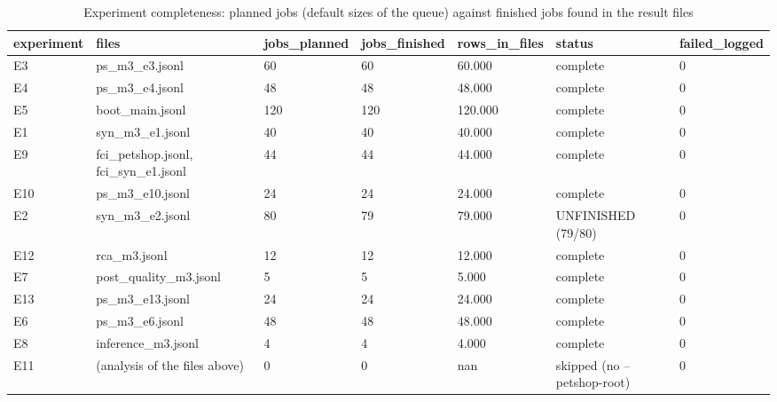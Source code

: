 \begin{table}[t]
\centering\footnotesize
\caption{Experiment completeness: planned jobs (default sizes of the queue) against finished jobs found in the result files}\label{tab:T0_completeness}
\begin{tabular}{@{}lllllll@{}}
\toprule
experiment & files & jobs\_planned & jobs\_finished & rows\_in\_files & status & failed\_logged\\
\midrule
E3 & ps\_m3\_e3.jsonl & 60 & 60 & 60.000 & complete & 0\\
E4 & ps\_m3\_e4.jsonl & 48 & 48 & 48.000 & complete & 0\\
E5 & boot\_main.jsonl & 120 & 120 & 120.000 & complete & 0\\
E1 & syn\_m3\_e1.jsonl & 40 & 40 & 40.000 & complete & 0\\
E9 & fci\_petshop.jsonl, fci\_syn\_e1.jsonl & 44 & 44 & 44.000 & complete & 0\\
E10 & ps\_m3\_e10.jsonl & 24 & 24 & 24.000 & complete & 0\\
E2 & syn\_m3\_e2.jsonl & 80 & 79 & 79.000 & UNFINISHED (79/80) & 0\\
E12 & rca\_m3.jsonl & 12 & 12 & 12.000 & complete & 0\\
E7 & post\_quality\_m3.jsonl & 5 & 5 & 5.000 & complete & 0\\
E13 & ps\_m3\_e13.jsonl & 24 & 24 & 24.000 & complete & 0\\
E6 & ps\_m3\_e6.jsonl & 48 & 48 & 48.000 & complete & 0\\
E8 & inference\_m3.jsonl & 4 & 4 & 4.000 & complete & 0\\
E11 & (analysis of the files above) & 0 & 0 & nan & skipped (no --petshop-root) & 0\\
\bottomrule
\end{tabular}
\end{table}
